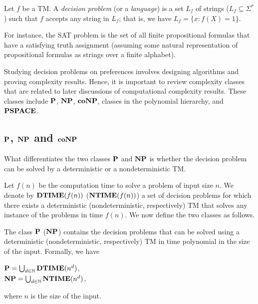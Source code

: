 \begin{definition}
	Let $f$ be a TM.
	A \textit{decision problem} (or a \textit{language}) is a set 
	$L_f$ of strings ($L_f \subseteq \Sigma^*$) such that $f$ accepts
	any string in $L_f$; that is, we have $L_f=\{x:f(X)=1\}$.
\end{definition}
For instance, the SAT problem is the set of all finite propositional
formulas that have a satisfying truth assignment (assuming some natural
representation of propositional formulas as strings over a finite alphabet).

Studying decision problems on preferences involves designing algorithms and
proving complexity results.  Hence, it is important to review complexity classes
that are related to later discussions of computational complexity results.
These classes include $\textbf{P}$, $\textbf{NP}$, $\textbf{coNP}$, classes in the polynomial
hierarchy, and $\textbf{PSPACE}$.


\subsection{$\textbf{P}$, $\textbf{NP}$ and $\textbf{coNP}$}
What differentiates the two classes $\textbf{P}$ and $\textbf{NP}$ is whether the decision problem
can be solved by a deterministic or a nondeterministic TM. \cite{Arora:Comput}

Let $f(n)$ be the computation time to solve a problem of input size $n$.
We denote by $\textbf{DTIME}(f(n))$ ($\textbf{NTIME}(f(n))$) a set of decision problems 
for which there exists a deterministic (nondeterministic, respectively) TM
that solves any instance of the problems in time $f(n)$.
We now define the two classes as follows.

\begin{definition}
	The class $\textbf{P}$ ($\textbf{NP}$) contains the decision problems that can be solved using a 
	deterministic (nondeterministic, respectively) TM 
	in time polynomial in the size of the input.  Formally, we have
	\begin{center}
		$\textbf{P} = \bigcup_{d \in \mathbb{N}} \textbf{DTIME}(n^d)$,\\
		$\textbf{NP} = \bigcup_{d \in \mathbb{N}} \textbf{NTIME}(n^d)$,
	\end{center}
	where $n$ is the size of the input.
\end{definition}

